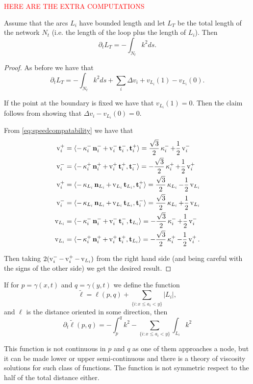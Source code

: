 \documentclass[11pt]{amsart}
\begin{document}
\textcolor{red}{HERE ARE THE EXTRA COMPUTATIONS}
\begin{lemma}
Assume that the arcs $L_i$ have bounded length and let
$L_T$ be the
total length of the network $N_t$ (i.e.
 the length of the loop plus the length of $L_i$). Then 
  $$\partial_t L_T=-\int_{N_t}k^2 ds.$$


\begin{proof}
As before we have that
$$\partial_t L_T=-\int_{N_t}k^2 ds+\sum_i \Delta v_i + v_{L_i}(1)-v_{L_i}(0).$$

If the point at the boundary is fixed we have that $v_{L_i}(1)=0$. 
Then the claim follows from showing that 
$\Delta v_i-v_{L_i}(0)=0$.

From \eqref{eq:speedcompatability}
we have that
\begin{align*}
\operatorname{v}_i^+ &= \langle{-\operatorname{\kappa}_i^- \operatorname{\mathbf{n}}_i^- + \operatorname{v}_i^- \operatorname{\mathbf{t}}_i^-},{\operatorname{\mathbf{t}}_i^+}\rangle = \frac{\sqrt{3}}{2} \operatorname{\kappa}_i^- + \frac{1}{2} \operatorname{v}_i^- \\
\operatorname{v}_i^- &= \langle{-\operatorname{\kappa}_i^+ \operatorname{\mathbf{n}}_i^+ + \operatorname{v}_i^+ \operatorname{\mathbf{t}}_i^+},{\operatorname{\mathbf{t}}_i^-}\rangle = - \frac{\sqrt{3}}{2} \operatorname{\kappa}_i^+ + \frac{1}{2} \operatorname{v}_i^+
\\
\operatorname{v}_i^+ &= \langle{-\operatorname{\kappa}_{L_i} \operatorname{\mathbf{n}}_{L_i} + \operatorname{v}_{L_i} \operatorname{\mathbf{t}}_{L_i}},{\operatorname{\mathbf{t}}_i^+}\rangle = \frac{\sqrt{3}}{2} \operatorname{\kappa}_{L_i} - \frac{1}{2} \operatorname{v}_{L_i}\\
\operatorname{v}_i^- &= \langle{-\operatorname{\kappa}_{L_i} \operatorname{\mathbf{n}}_{L_i} + \operatorname{v}_{L_i} \operatorname{\mathbf{t}}_{L_i}},{\operatorname{\mathbf{t}}_i^-}\rangle =  \frac{\sqrt{3}}{2} \operatorname{\kappa}_{L_i} + \frac{1}{2} \operatorname{v}_{L_i}\\
\operatorname{v}_{L_i} &= \langle{-\operatorname{\kappa}_i^- \operatorname{\mathbf{n}}_i^- + \operatorname{v}_i^- \operatorname{\mathbf{t}}_i^-},{\operatorname{\mathbf{t}}_{L_i}}\rangle = - \frac{\sqrt{3}}{2} \operatorname{\kappa}_i^- + \frac{1}{2} \operatorname{v}_i^-\\
\operatorname{v}_{L_i} &= \langle{-\operatorname{\kappa}_i^+ \operatorname{\mathbf{n}}_i^+ + \operatorname{v}_i^+ \operatorname{\mathbf{t}}_i^+},{\operatorname{\mathbf{t}}_{L_i}}\rangle = - \frac{\sqrt{3}}{2} \operatorname{\kappa}_i^+ - \frac{1}{2} \operatorname{v}_i^+.
\end{align*}

Then taking $2(\operatorname{v}_i^--
\operatorname{v}_i^+-\operatorname{v}_{L_i})$
from the right hand side (and being careful with the signs of the other side) we get the desired result.

\end{proof}
\end{lemma}
\begin{remark}
If for $p=\gamma(x,t)$ and $q=\gamma(y,t)$ we define the function 
$$\tilde{\ell}=\ell(p,q)+\sum_{\{i:x\leq a_i <y\}}|L_i|,$$
and $\ell$ is the distance oriented in some direction, then
$$\partial_t\tilde{\ell}(p,q)=-\int_p^qk^2- \sum_{\{i:x\leq a_i <y\}}\int_{L_i} k^2$$


This function is not continuous in $p$ and $q$ as one of them approaches a node, but it can be made lower or upper semi-continuous and there is a theory of viscosity solutions for such class of functions. The function is not symmetric respect to the half of the total distance either.
\end{remark}
\end{document}
